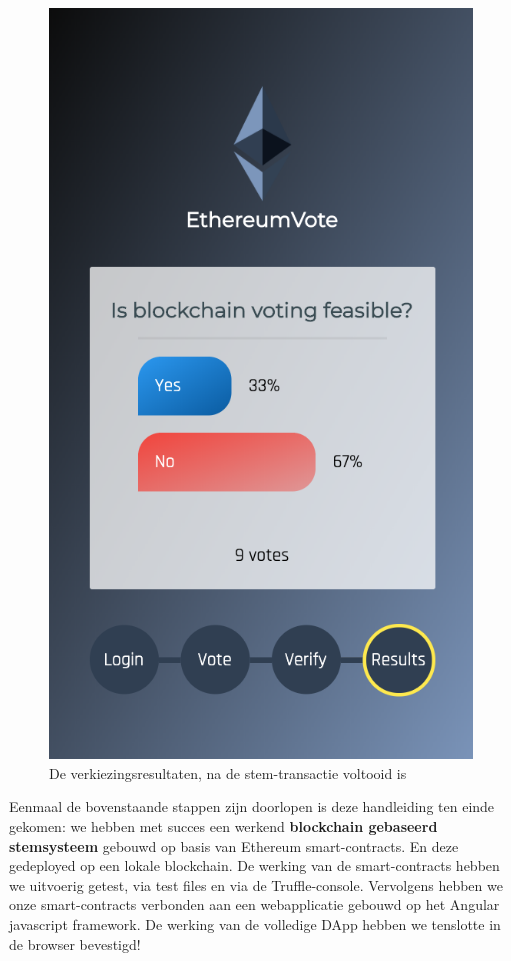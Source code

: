 \begin{figure}
		\includegraphics[width=\linewidth/3]{img/screen_results.png}
		\caption{De verkiezingsresultaten, na de stem-transactie voltooid is}
		\label{fig:screen_voting3}
	\end{figure}

	Eenmaal de bovenstaande stappen zijn doorlopen is deze handleiding ten einde gekomen: we hebben met succes een werkend \textbf{blockchain gebaseerd stemsysteem} gebouwd op basis van Ethereum smart-contracts. En deze gedeployed op een lokale blockchain. De werking van de smart-contracts hebben we uitvoerig getest, via test files en via de Truffle-console. Vervolgens hebben we onze smart-contracts verbonden aan een webapplicatie gebouwd op het Angular javascript framework. De werking van de volledige DApp hebben we tenslotte in de browser bevestigd! 
	
